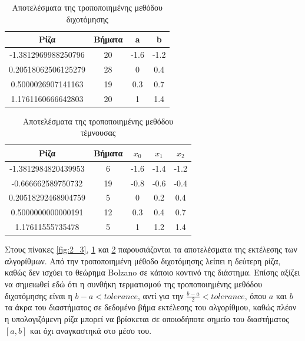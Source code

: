 \documentclass[a4paper,11pt]{article}
\newcommand{\lt}{\latintext}
\newcommand{\gt}{\greektext}
\begin{document}
\begin{table}[h]
\centering
\caption{Αποτελέσματα της τροποποιημένης μεθόδου διχοτόμησης}
\label{fig:2_4}
\begin{tabular}{c c c c}
    \gt Ρίζα & Βήματα & \lt a & \lt b  \\ \hline
    -1.3812969988250796 & 20 & -1.6 & -1.2 \\
    0.20518062506125279 & 28 & 0 & 0.4 \\
    0.5000026907141163 & 19 & 0.3 & 0.7 \\
    1.1761160666642803 & 20 & 1 & 1.4 \\
\end{tabular}
\end{table}


\begin{table}[h]
\centering
\caption{\gt Αποτελέσματα της τροποποιημένης μεθόδου τέμνουσας}
\label{fig:2_5}
\begin{tabular}{c c c c c}
    \gt Ρίζα & Βήματα & $x_0$ & $x_1$ & $x_2$ \\ \hline
    -1.3812984820439953 & 6 & -1.6 & -1.4 & -1.2 \\
    -0.666662589750732 & 19 & -0.8 & -0.6 & -0.4 \\
    0.20518292468904759 & 5 & 0 & 0.2 & 0.4 \\
    0.5000000000000191 & 12 & 0.3 & 0.4 & 0.7 \\
    1.17611555735478 & 5 & 1 & 1.2 & 1.4 \\
\end{tabular}
\end{table}

Στους πίνακες \ref{fig:2_3}, \ref{fig:2_4} και \ref{fig:2_5} παρουσιάζονται τα αποτελέσματα της εκτέλεσης των αλγορίθμων. Από την τροποποιημένη μέθοδο διχοτόμησης λείπει η δεύτερη ρίζα, καθώς δεν ισχύει το θεώρημα \lt Bolzano \gt σε κάποιο κοντινό της διάστημα. Επίσης αξίζει να σημειωθεί εδώ ότι η συνθήκη τερματισμού της τροποποιημένης μεθόδου διχοτόμησης είναι η \(b-a < tolerance\), αντί για την \(\frac{b-a}{2} < tolerance\), όπου $a$ και $b$ τα άκρα του διαστήματος σε δεδομένο βήμα εκτέλεσης του αλγορίθμου, καθώς πλέον η υπολογιζόμενη ρίζα μπορεί να βρίσκεται σε οποιοδήποτε σημείο του διαστήματος \(\left[ a, b\right]\) και όχι αναγκαστηκά στο μέσο του. 

\subsection{} %
\end{document}
